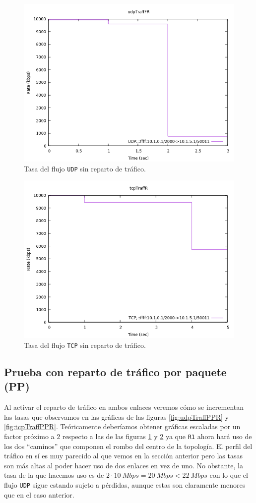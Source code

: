 \documentclass[11pt]{article}
\begin{document}
                \begin{figure}
                    \centering
                    \includegraphics[width=0.6\linewidth]{udpTraffNoBalancingR.png}
                    \caption{Tasa del flujo \texttt{UDP} sin reparto de tráfico.}
                    \label{fig:udpTraffNoBalancingR}
                \end{figure}

                \begin{figure}
                    \centering
                    \includegraphics[width=0.6\linewidth]{tcpTraffNoBalancingR.png}
                    \caption{Tasa del flujo \texttt{TCP} sin reparto de tráfico.}
                    \label{fig:tcpTraffNoBalancingR}
                \end{figure}

            \subsection{Prueba con reparto de tráfico por paquete (PP)}
                Al activar el reparto de tráfico en ambos enlaces veremos cómo se incrementan las tasas que observamos en las gráficas de las figuras \ref{fig:udpTraffPPR} y \ref{fig:tcpTraffPPR}. Teóricamente deberíamos obtener gráficas escaladas por un factor próximo a $2$ respecto a las de las figuras \ref{fig:udpTraffNoBalancingR} y \ref{fig:tcpTraffNoBalancingR} ya que \texttt{R1} ahora hará uso de los dos ``caminos'' que componen el rombo del centro de la topología. El perfil del tráfico en sí es muy parecido al que vemos en la sección anterior pero las tasas son más altas al poder hacer uso de dos enlaces en vez de uno. No obstante, la tasa de la que hacemos uso es de $2 \cdot 10\ Mbps = 20\ Mbps < 22\ Mbps$ con lo que el flujo \texttt{UDP} sigue estando sujeto a pérdidas, aunque estas son claramente menores que en el caso anterior.
\end{document}
